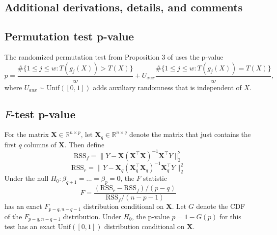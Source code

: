 \documentclass{article}
\newcommand{\R}{\mathbb{R}}
\begin{document}



\begin{appendix}

\section{Additional derivations, details, and comments}

\subsection{Permutation test p-value}
\label{sec:perm_test_appdx}

The randomized permutation test from Proposition 3 of \cite{Hemerik} uses the p-value
\begin{equation*}
    p = \frac{\#\{1 \leq j \leq w : T(g_j(X)) > T(X) \}}{w} + U_{aux} \frac{\#\{1 \leq j \leq w : T(g_j(X)) = T(X) \}}{w},
\end{equation*}
where $U_{aux} \sim \text{Unif}([0, 1])$ adds auxiliary randomness that is independent of $X$.

\subsection{$F$-test p-value}
\label{sec:f_test_appdx}

For the matrix $\boldsymbol{X} \in \R^{n \times p}$, let $\boldsymbol{X}_q \in \R^{n \times q}$ denote the matrix that just contains the first $q$ columns of $\boldsymbol{X}$.
Then define 
\begin{equation*}
    \text{RSS}_f = \|Y -  \boldsymbol{X} (\boldsymbol{X}^\top \boldsymbol{X})^{-1} \boldsymbol{X}^\top Y\|^2_2
\end{equation*}
\begin{equation*}
    \text{RSS}_r = \|Y -  \boldsymbol{X}_q (\boldsymbol{X}_q^\top \boldsymbol{X}_q)^{-1} \boldsymbol{X}_q^\top Y\|^2_2
\end{equation*}
Under the null $H_0 : \beta_{q+1} = \dots = \beta_p = 0$, the $F$ statistic 
\begin{equation*}
    F = \frac{(\text{RSS}_r - \text{RSS}_f)/(p-q)}{\text{RSS}_f/(n-p-1)}
\end{equation*}
has an exact $F_{p-q, n-q-1}$ distribution conditional on $\boldsymbol{X}$. Let $G$ denote the CDF of the $F_{p-q, n-q-1}$ distribution. Under $H_0$, the p-value $p = 1 - G(p)$ for this test has an exact $\text{Unif}([0, 1])$ distribution conditional on $\boldsymbol{X}$.


\end{appendix}
\end{document}
